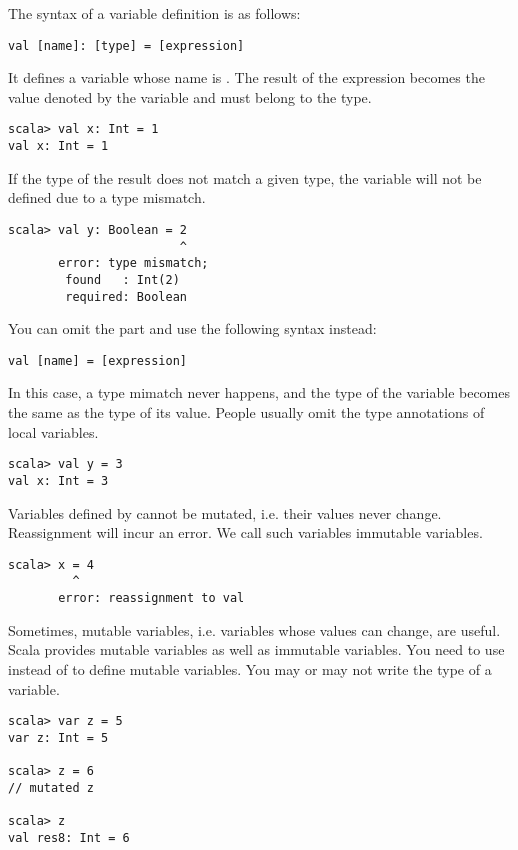 The syntax of a variable definition is as follows:

\begin{verbatim}
val [name]: [type] = [expression]
\end{verbatim}

It defines a variable whose name is \code{[name]}.
The result of the expression becomes the value denoted by the variable and
must belong to the type.

\begin{verbatim}
scala> val x: Int = 1
val x: Int = 1
\end{verbatim}

If the type of the result does not match a given type, the variable will not be
defined due to a type mismatch.

\begin{verbatim}
scala> val y: Boolean = 2
                        ^
       error: type mismatch;
        found   : Int(2)
        required: Boolean
\end{verbatim}

You can omit the \code{: [type]} part and use the following syntax instead:

\begin{verbatim}
val [name] = [expression]
\end{verbatim}

In this case, a type mimatch never happens, and the
type of the variable becomes the same as the type of its value.
People usually omit the type annotations of local variables.

\begin{verbatim}
scala> val y = 3
val x: Int = 3
\end{verbatim}

Variables defined by  cannot be mutated, i.e. their values never
change. Reassignment will incur an error. We call such variables immutable
variables.

\begin{verbatim}
scala> x = 4
         ^
       error: reassignment to val
\end{verbatim}

Sometimes, mutable variables, i.e. variables whose values can change, are useful.
Scala provides mutable variables as well as immutable variables. You need to use
 instead of  to define mutable variables. You may or may not write
the type of a variable.

\begin{verbatim}
scala> var z = 5
var z: Int = 5

scala> z = 6
// mutated z

scala> z
val res8: Int = 6
\end{verbatim}

